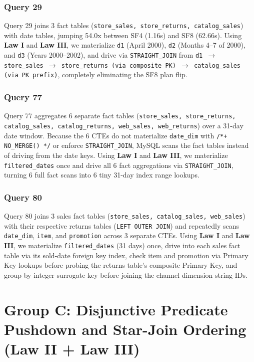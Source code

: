 \documentclass{ULBreport}
\begin{document}
\subsubsection{Query 29}
Query 29 joins 3 fact tables (\texttt{store\_sales, store\_returns, catalog\_sales}) with date tables, jumping 54.0x between SF4 (1.16s) and SF8 (62.66s). Using \textbf{Law I} and \textbf{Law III}, we materialize \texttt{d1} (April 2000), \texttt{d2} (Months 4--7 of 2000), and \texttt{d3} (Years 2000--2002), and drive via \texttt{STRAIGHT\_JOIN} from \texttt{d1 $\rightarrow$ store\_sales $\rightarrow$ store\_returns (via composite PK) $\rightarrow$ catalog\_sales (via PK prefix)}, completely eliminating the SF8 plan flip.
\subsubsection{Query 77}
Query 77 aggregates 6 separate fact tables (\texttt{store\_sales, store\_returns, catalog\_sales, catalog\_returns, web\_sales, web\_returns}) over a 31-day date window. Because the 6 CTEs do not materialize \texttt{date\_dim} with \texttt{/*+ NO\_MERGE() */} or enforce \texttt{STRAIGHT\_JOIN}, MySQL scans the fact tables instead of driving from the date keys. Using \textbf{Law I} and \textbf{Law III}, we materialize \texttt{filtered\_dates} once and drive all 6 fact aggregations via \texttt{STRAIGHT\_JOIN}, turning 6 full fact scans into 6 tiny 31-day index range lookups.
\subsubsection{Query 80}
Query 80 joins 3 sales fact tables (\texttt{store\_sales, catalog\_sales, web\_sales}) with their respective returns tables (\texttt{LEFT OUTER JOIN}) and repeatedly scans \texttt{date\_dim}, \texttt{item}, and \texttt{promotion} across 3 separate CTEs. Using \textbf{Law I} and \textbf{Law III}, we materialize \texttt{filtered\_dates} (31 days) once, drive into each sales fact table via its sold-date foreign key index, check item and promotion via Primary Key lookups before probing the returns table's composite Primary Key, and group by integer surrogate key before joining the channel dimension string IDs.


\section{Group C: Disjunctive Predicate Pushdown and Star-Join Ordering (Law II + Law III)}
\end{document}
